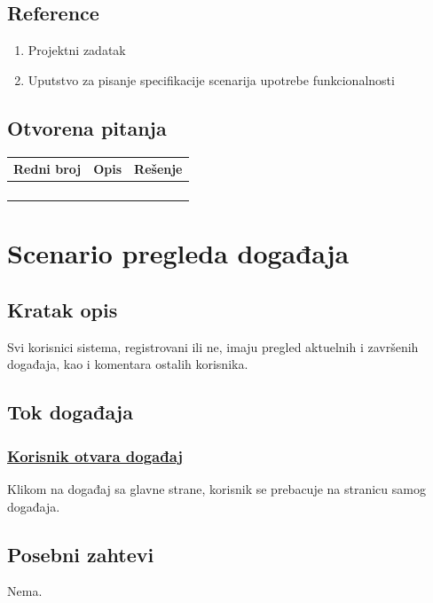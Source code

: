 \documentclass[11pt,a4paper]{article}
\begin{document}
\subsection{Reference}
\begin{enumerate}
    \item Projektni zadatak
    \item Uputstvo za pisanje specifikacije scenarija upotrebe funkcionalnosti
\end{enumerate}
\subsection{Otvorena pitanja}
\begin{center}
\begin{tabular}{| >{\centering\arraybackslash}m{1.9cm} | >{\centering\arraybackslash}m{4.9cm} | >{\centering\arraybackslash}m{4.9cm} |}
\hline
\rowcolor[HTML]{000000} 
{\color[HTML]{FFFFFF} Redni broj } & {\color[HTML]{FFFFFF} Opis } & {\color[HTML]{FFFFFF} Rešenje } \\ \hline
 &  & \\ \hline
 &  &  \\ \hline
 &  &  \\ \hline
 &  &  \\ \hline
\end{tabular}
\end{center}

\newpage

\section{Scenario pregleda događaja}
\subsection{Kratak opis}
Svi korisnici sistema, registrovani ili ne, imaju pregled aktuelnih i završenih događaja, kao i komentara ostalih korisnika.
\subsection{Tok događaja}
\subsubsection{\underline{Korisnik otvara događaj}}
Klikom na događaj sa glavne strane, korisnik se prebacuje na stranicu samog događaja.
\subsection{Posebni zahtevi}
Nema.
\end{document}
